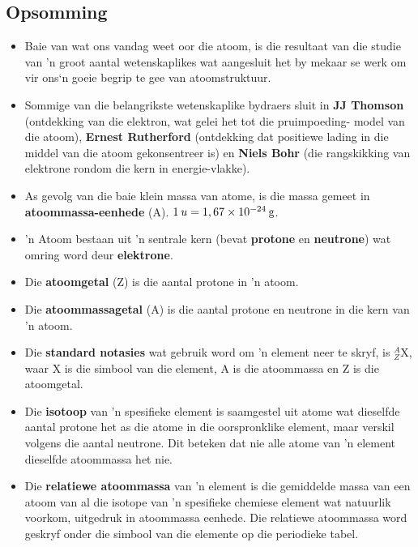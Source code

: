             \subsection*{Opsomming}
            \nopagebreak
      \label{m38741*id262657}\begin{itemize}[noitemsep]
            \label{m38741*uid169}\item Baie van wat ons vandag weet oor die atoom, is die resultaat van die studie van 'n groot aantal wetenskaplikes wat aangesluit het by mekaar se werk om vir ons‘n goeie begrip te gee van atoomstruktuur.
\label{m38741*uid170}\item Sommige van die belangrikste wetenskaplike bydraers sluit in \textbf{JJ Thomson} (ontdekking van die elektron, wat gelei het tot die pruimpoeding- model van die atoom), \textbf{Ernest Rutherford} (ontdekking dat positiewe lading in die middel van die atoom gekonsentreer is) en \textbf{Niels Bohr} (die rangskikking van elektrone rondom die kern in energie-vlakke).
\label{m38741*uid171}\item As gevolg van die baie klein massa van atome, is die massa gemeet in \textbf{atoommassa-eenhede} (A). $1\phantom{\rule{2pt}{0ex}}u=1,67\ensuremath{\times}10{}^{-24}\phantom{\rule{2pt}{0ex}}\text{g}$.
\label{m38741*uid172}\item 'n Atoom bestaan uit 'n sentrale kern (bevat \textbf{protone} en \textbf{neutrone}) wat omring word deur \textbf{elektrone}.
\label{m38741*uid173}\item Die \textbf{atoomgetal} (Z) is die aantal protone in 'n atoom.
\label{m38741*uid174}\item Die \textbf{atoommassagetal} (A) is die aantal protone en neutrone in die kern van 'n atoom.
\label{m38741*uid175}\item Die \textbf{standard notasies} wat gebruik word om 'n element neer te skryf, is $_{Z}^{A}\text{X}$, waar X is die simbool van die element, A is die atoommassa en Z is die atoomgetal.
\label{m38741*uid176}\item Die \textbf{isotoop} van 'n spesifieke element is saamgestel uit atome wat dieselfde aantal protone het as die atome in die oorspronklike element, maar verskil volgens die aantal neutrone. Dit beteken dat nie alle atome van 'n element dieselfde atoommassa het nie.
\label{m38741*uid177}\item Die \textbf{relatiewe atoommassa} van 'n element is die gemiddelde massa van een atoom van al die isotope van 'n spesifieke chemiese element wat natuurlik voorkom, uitgedruk in atoommassa eenhede. Die relatiewe atoommassa word geskryf onder die simbool van die elemente op die periodieke tabel.

\end{itemize}
